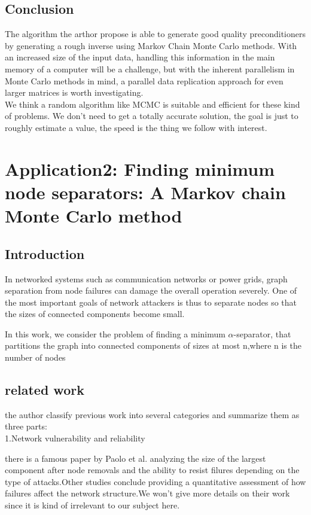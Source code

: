 \documentclass[10pt,journal]{IEEEtran}
\begin{document}
\subsection{Conclusion}
The algorithm the arthor propose is able to generate good quality preconditioners by generating a rough inverse using Markov Chain Monte Carlo methods. With an increased size of the input data, handling this information in the main memory of a computer will be a challenge, but with the inherent parallelism in Monte Carlo methods in mind, a parallel data replication approach for even larger matrices is worth investigating.\\
We think a random algorithm like MCMC is suitable and efficient for these kind of problems. We don't need to get a totally accurate solution, the goal is just to roughly estimate a value, the speed is the thing we follow with interest.

\section{Application2: Finding minimum node separators: A Markov chain Monte Carlo method}
\subsection{Introduction}

In networked systems such as communication networks or power grids, graph
separation from node failures can damage the overall operation severely. One
of the most important goals of network attackers is thus to separate nodes so
that the sizes of connected components become small.

 In this work, we consider the problem of finding a minimum $\alpha$-separator, that partitions the graph into connected components of sizes at most n,where n is the number of nodes

\subsection{related work}

the author classify previous work into several categories and summarize them as three parts:\\

1.Network vulnerability and reliability

there is a famous paper by Paolo et al. analyzing the size of the largest component after node removals and the ability to resist filures depending on the type of attacks.Other studies conclude providing a quantitative assessment of how failures affect the network structure.We won't give more details on their work since it is kind of irrelevant to our subject here. \\
\end{document}
